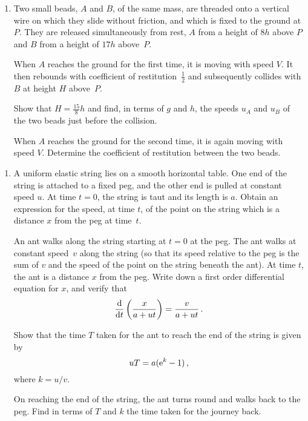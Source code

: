 \documentclass[a4, 11pt]{report}
\newlength{\qspace}
\newcounter{qnumber}
\newenvironment{question}%
 {\vspace{\qspace}
  \begin{enumerate}[\bfseries 1\quad][10]%
    \setcounter{enumi}{\value{qnumber}}%
    \item%
 }
{
  \end{enumerate}
  \filbreak
  \stepcounter{qnumber}
 }
\def\d{{\rm d}}
\def\e{{\rm e}}
\begin{document}
\begin{question} Two small beads, $A$ and $B$, 
of the same mass, are threaded onto a 
vertical wire on which they slide without friction, 
and which is fixed to the ground at $P$. 
They are released simultaneously from rest, $A$
 from a height of $8h$ above $P$ and $B$ from
 a height of $17h$ above~$P$. 

When  $A$ reaches the ground
for the first time, it is
moving with speed $ V$. It then 
rebounds with coefficient of restitution~$\frac{1}{2}$ 
and subsequently collides with  $B$ at height $H$ above~$P$.

Show that $H= \frac{15}8h$ and find, in terms of $g$ and $h$, the speeds $u_A$ and 
$u_B$ of the two beads just before the collision.
 
When $A$ reaches the ground for the second time, 
it is again moving  with speed $ V$.
Determine the coefficient of restitution between the two beads. 


\end{question}





\begin{question}
A uniform elastic string lies on a smooth horizontal table.
One end of the string
 is attached to a fixed peg, 
and the other
end is pulled at constant speed $u$. At time
$t=0$, the string is 
taut and its length is $a$. Obtain an expression for 
the speed, at time $t$,
of  the point on the string
which is a distance
$x$ from the peg at time~$t$.

An ant walks along the string starting at $t=0$ at the peg. 
The ant walks at constant speed~$v$ along the string (so that
its speed relative to the peg is the sum of $v$ and the speed of the 
point on the string beneath the ant).
At time $t$, the ant is a distance $x$ from the 
peg. 
Write down
 a first order differential equation
for $x$, and 
verify
that
\[
\frac{\d  }{\d t} \left( \frac x {a+ut}\right) = \frac v {a+ut} \,.
\]

Show that  the time $T$ taken for the ant to 
reach the end of the string is given by 
\[uT = a(\e^k-1)\,,\]
  where $k=u/v$.

On reaching the end of the string, the ant turns round and walks back to the 
peg. Find in terms of $T$ and $k$
 the time taken for the journey
back.


\end{question}
\end{document}
